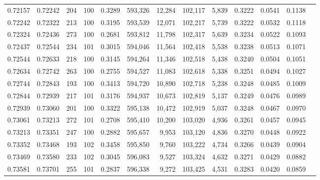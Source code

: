 \begin{tabular}{rrrrrrrrrrrrr}
0.72157 & 0.72242 &   204 & 100 &                                     0.3289 & 593,326 &  12,284 & 102,117 &   5,839 & 0.3222 & 0.0541 & 0.1138 \\
0.72242 & 0.72322 &   213 & 100 &                                     0.3195 & 593,539 &  12,071 & 102,217 &   5,739 & 0.3222 & 0.0532 & 0.1118 \\
0.72324 & 0.72436 &   273 & 100 &                                     0.2681 & 593,812 &  11,798 & 102,317 &   5,639 & 0.3234 & 0.0522 & 0.1093 \\
0.72437 & 0.72544 &   234 & 101 &                                     0.3015 & 594,046 &  11,564 & 102,418 &   5,538 & 0.3238 & 0.0513 & 0.1071 \\
0.72544 & 0.72633 &   218 & 100 &                                     0.3145 & 594,264 &  11,346 & 102,518 &   5,438 & 0.3240 & 0.0504 & 0.1051 \\
0.72634 & 0.72742 &   263 & 100 &                                     0.2755 & 594,527 &  11,083 & 102,618 &   5,338 & 0.3251 & 0.0494 & 0.1027 \\
0.72744 & 0.72843 &   193 & 100 &                                     0.3413 & 594,720 &  10,890 & 102,718 &   5,238 & 0.3248 & 0.0485 & 0.1009 \\
0.72844 & 0.72939 &   217 & 101 &                                     0.3176 & 594,937 &  10,673 & 102,819 &   5,137 & 0.3249 & 0.0476 & 0.0989 \\
0.72939 & 0.73060 &   201 & 100 &                                     0.3322 & 595,138 &  10,472 & 102,919 &   5,037 & 0.3248 & 0.0467 & 0.0970 \\
0.73061 & 0.73213 &   272 & 101 &                                     0.2708 & 595,410 &  10,200 & 103,020 &   4,936 & 0.3261 & 0.0457 & 0.0945 \\
0.73213 & 0.73351 &   247 & 100 &                                     0.2882 & 595,657 &   9,953 & 103,120 &   4,836 & 0.3270 & 0.0448 & 0.0922 \\
0.73352 & 0.73468 &   193 & 102 &                                     0.3458 & 595,850 &   9,760 & 103,222 &   4,734 & 0.3266 & 0.0439 & 0.0904 \\
0.73469 & 0.73580 &   233 & 102 &                                     0.3045 & 596,083 &   9,527 & 103,324 &   4,632 & 0.3271 & 0.0429 & 0.0882 \\
0.73581 & 0.73701 &   255 & 101 &                                     0.2837 & 596,338 &   9,272 & 103,425 &   4,531 & 0.3283 & 0.0420 & 0.0859 \\

\end{tabular}
